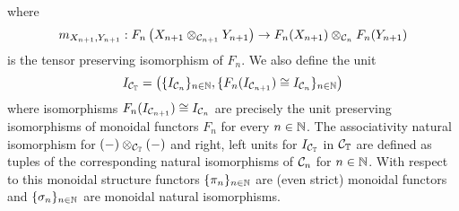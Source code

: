 where
$$m_{X_{n+1},Y_{n+1}}:F_{n}\left(X_{n+1}\otimes_{{\mathcal C}_{n+1}} Y_{n+1}\right) \rightarrow F_{n}(X_{n+1})\otimes_{{\mathcal C}_n}F_{n}(Y_{n+1})$$
is the tensor preserving isomorphism of $F_{n}$. We also define the unit
$$I_{{\mathcal C}_{\mathbb{T}}} = \left(\{I_{{\mathcal C}_n}\}_{n\in {\mathbb N}}, \{F_{n}(I_{{\mathcal C}_{n+1}})\cong I_{{\mathcal C}_n}\}_{n\in {\mathbb N}}\right)$$
where isomorphisms $F_{n}(I_{{\mathcal C}_{n+1}})\cong I_{{\mathcal C}_n}$ are precisely the unit preserving isomorphisms of monoidal functors $F_{n}$ for every $n\in {\mathbb N}$. The associativity natural isomorphism for $(-)\otimes_{{\mathcal C}_{\mathbb{T}}}(-)$ and right, left units for $I_{{\mathcal C}_{\mathbb{T}}}$ in ${\mathcal C}_{\mathbb{T}}$ are defined as tuples of the corresponding natural isomorphisms of ${\mathcal C}_n$ for $n\in {\mathbb N}$. With respect to this monoidal structure functors $\{\pi_n\}_{n\in {\mathbb N}}$ are (even strict) monoidal functors and $\{\sigma_n\}_{n\in {\mathbb N}}$ are monoidal natural isomorphisms.















\small




